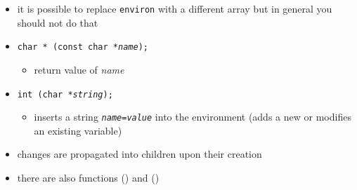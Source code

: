 
\begin{slide}
\begin{itemize}
\item it is possible to replace \texttt{environ} with a different array but in
general you should not do that
\item \texttt{char * (const char *\emph{name});}
    \begin{itemize}
    \item return value of \emph{name}
    \end{itemize}
\item \texttt{int  (char *\emph{string});} 
    \begin{itemize}
    \item inserts a string \texttt{\emph{name}=\emph{value}} into the
    environment (adds a new or modifies an existing variable)
    \end{itemize}
\item changes are propagated into children upon their creation
\item there are also functions () and ()
\end{itemize}
\end{slide}


